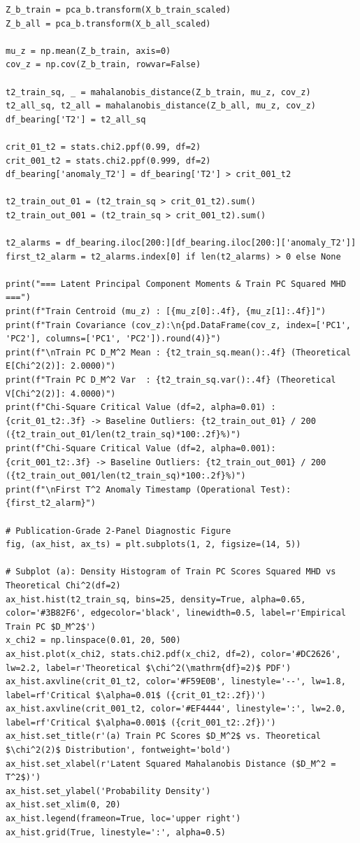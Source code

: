 \begin{lstlisting}[style=pycode]
Z_b_train = pca_b.transform(X_b_train_scaled)
Z_b_all = pca_b.transform(X_b_all_scaled)

mu_z = np.mean(Z_b_train, axis=0)
cov_z = np.cov(Z_b_train, rowvar=False)

t2_train_sq, _ = mahalanobis_distance(Z_b_train, mu_z, cov_z)
t2_all_sq, t2_all = mahalanobis_distance(Z_b_all, mu_z, cov_z)
df_bearing['T2'] = t2_all_sq

crit_01_t2 = stats.chi2.ppf(0.99, df=2)
crit_001_t2 = stats.chi2.ppf(0.999, df=2)
df_bearing['anomaly_T2'] = df_bearing['T2'] > crit_001_t2

t2_train_out_01 = (t2_train_sq > crit_01_t2).sum()
t2_train_out_001 = (t2_train_sq > crit_001_t2).sum()

t2_alarms = df_bearing.iloc[200:][df_bearing.iloc[200:]['anomaly_T2']]
first_t2_alarm = t2_alarms.index[0] if len(t2_alarms) > 0 else None

print("=== Latent Principal Component Moments & Train PC Squared MHD ===")
print(f"Train Centroid (mu_z) : [{mu_z[0]:.4f}, {mu_z[1]:.4f}]")
print(f"Train Covariance (cov_z):\n{pd.DataFrame(cov_z, index=['PC1', 'PC2'], columns=['PC1', 'PC2']).round(4)}")
print(f"\nTrain PC D_M^2 Mean : {t2_train_sq.mean():.4f} (Theoretical E[Chi^2(2)]: 2.0000)")
print(f"Train PC D_M^2 Var  : {t2_train_sq.var():.4f} (Theoretical V[Chi^2(2)]: 4.0000)")
print(f"Chi-Square Critical Value (df=2, alpha=0.01) : {crit_01_t2:.3f} -> Baseline Outliers: {t2_train_out_01} / 200 ({t2_train_out_01/len(t2_train_sq)*100:.2f}%)")
print(f"Chi-Square Critical Value (df=2, alpha=0.001): {crit_001_t2:.3f} -> Baseline Outliers: {t2_train_out_001} / 200 ({t2_train_out_001/len(t2_train_sq)*100:.2f}%)")
print(f"\nFirst T^2 Anomaly Timestamp (Operational Test): {first_t2_alarm}")

# Publication-Grade 2-Panel Diagnostic Figure
fig, (ax_hist, ax_ts) = plt.subplots(1, 2, figsize=(14, 5))

# Subplot (a): Density Histogram of Train PC Scores Squared MHD vs Theoretical Chi^2(df=2)
ax_hist.hist(t2_train_sq, bins=25, density=True, alpha=0.65, color='#3B82F6', edgecolor='black', linewidth=0.5, label=r'Empirical Train PC $D_M^2$')
x_chi2 = np.linspace(0.01, 20, 500)
ax_hist.plot(x_chi2, stats.chi2.pdf(x_chi2, df=2), color='#DC2626', lw=2.2, label=r'Theoretical $\chi^2(\mathrm{df}=2)$ PDF')
ax_hist.axvline(crit_01_t2, color='#F59E0B', linestyle='--', lw=1.8, label=rf'Critical $\alpha=0.01$ ({crit_01_t2:.2f})')
ax_hist.axvline(crit_001_t2, color='#EF4444', linestyle=':', lw=2.0, label=rf'Critical $\alpha=0.001$ ({crit_001_t2:.2f})')
ax_hist.set_title(r'(a) Train PC Scores $D_M^2$ vs. Theoretical $\chi^2(2)$ Distribution', fontweight='bold')
ax_hist.set_xlabel(r'Latent Squared Mahalanobis Distance ($D_M^2 = T^2$)')
ax_hist.set_ylabel('Probability Density')
ax_hist.set_xlim(0, 20)
ax_hist.legend(frameon=True, loc='upper right')
ax_hist.grid(True, linestyle=':', alpha=0.5)


\end{lstlisting}
